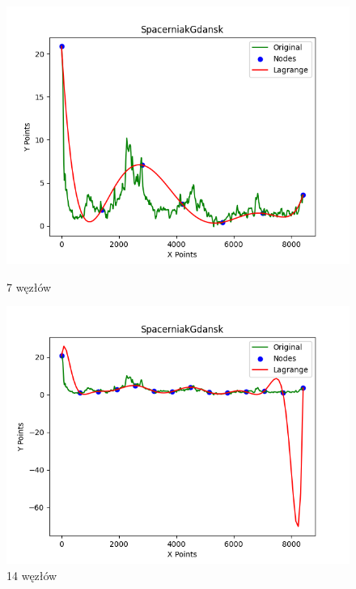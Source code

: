 \documentclass{article}
\begin{document}
\begin{figure}[H]
    \centering
    \begin{minipage}[b]{0.49\textwidth}
        \centering
        \includegraphics[width=\textwidth]{plots/SpacerniakGdansk_lagrange_7.png}
        \caption{7 węzłów}
        \label{fig:7nodes}
    \end{minipage}
    \hfill
    \begin{minipage}[b]{0.49\textwidth}
        \centering
        \includegraphics[width=\textwidth]{plots/SpacerniakGdansk_lagrange_14.png}
        \caption{14 węzłów}
        \label{fig:14nodes}
    \end{minipage}
\end{figure}
\end{document}
